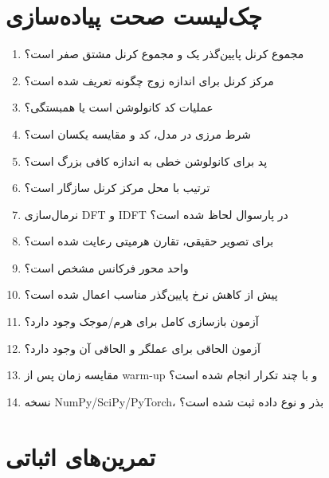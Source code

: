\documentclass[12pt,openany,oneside]{book}
\begin{document}
\section{چک‌لیست صحت پیاده‌سازی}

\begin{enumerate}
\item مجموع کرنل پایین‌گذر یک و مجموع کرنل مشتق صفر است؟
\item مرکز کرنل برای اندازه زوج چگونه تعریف شده است؟
\item عملیات کد کانولوشن است یا همبستگی؟
\item شرط مرزی در مدل، کد و مقایسه یکسان است؟
\item پد برای کانولوشن خطی به اندازه کافی بزرگ است؟
\item ترتیب  با محل مرکز کرنل سازگار است؟
\item نرمال‌سازی DFT و IDFT در پارسوال لحاظ شده است؟
\item برای تصویر حقیقی، تقارن هرمیتی رعایت شده است؟
\item واحد محور فرکانس مشخص است؟
\item پیش از کاهش نرخ پایین‌گذر مناسب اعمال شده است؟
\item آزمون بازسازی کامل برای هرم/موجک وجود دارد؟
\item آزمون الحاقی برای عملگر و الحاقی آن وجود دارد؟
\item مقایسه زمان پس از warm-up و با چند تکرار انجام شده است؟
\item نسخه NumPy/SciPy/PyTorch، بذر و نوع داده ثبت شده است؟
\end{enumerate}

\section{تمرین‌های اثباتی}
\end{document}
